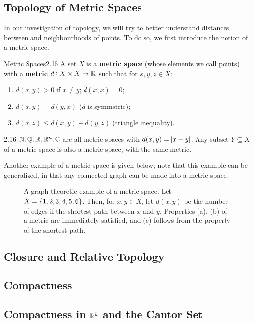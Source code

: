 \subsection{Topology of Metric Spaces}
In our investigation of topology, we will try to better understand distances between and neighbourhoods of points. To do so, we first introduce the notion of a metric space.
\begin{definition}{Metric Spaces}{2.15}
    A set $X$ is a \textbf{metric space} (whose elements we call points) with a \textbf{metric} $d: X \times X \mapsto \mathbb{R}$ such that for $x, y, z \in X$:
    \begin{enumerate}
        \item $d(x, y) > 0$ if $x \neq y$; $d(x, x) = 0$;
        \item $d(x, y) = d(y, x)$ ($d$ is symmetric);
        \item $d(x, z) \leq d(x, y) + d(y, z)$ (triangle inequality).
    \end{enumerate}
\end{definition}
\begin{example}{}{2.16}
    $\mathbb{N}, \mathbb{Q}, \mathbb{R}, \mathbb{R}^n, \mathbb{C}$ are all metric spaces with $d(x, y) = \abs{x - y}$. Any subset $Y \subseteq X$ of a metric space is also a metric space, with the same metric. 
\end{example}
\noindent Another example of a metric space is given below; note that this example can be generalized, in that any connected graph can be made into a metric space. 
\begin{figure}[htbp]
    \centering
    
    \caption{A graph-theoretic example of a metric space. Let $X = \set{1, 2, 3, 4, 5, 6}$. Then, for $x, y \in X$, let $d(x, y)$ be the number of edges if the shortest path between $x$ and $y$. Properties (a), (b) of a metric are immediately satisfied, and (c) follows from the property of the shortest path.}
    \label{<label>}
\end{figure}

\subsection{Closure and Relative Topology}
\subsection{Compactness}
\subsection{Compactness in \texorpdfstring{$\mathbb{R}^k$}{TEXT} and the Cantor Set}

